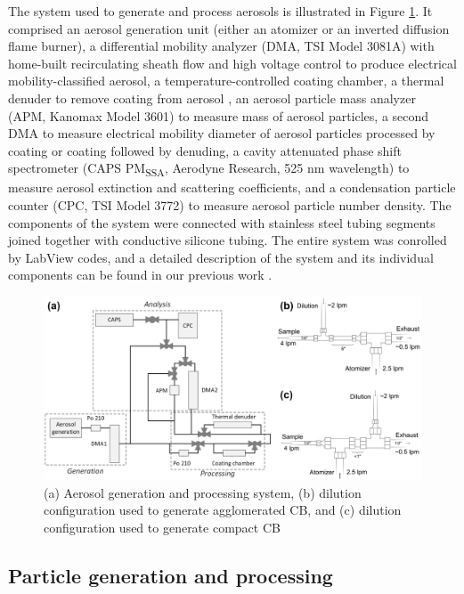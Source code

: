 

The system used to generate and process aerosols is illustrated in Figure \ref{fig:system}. It comprised an aerosol generation unit (either an atomizer or an inverted diffusion flame burner), a differential mobility analyzer (DMA, TSI Model 3081A) with home-built recirculating sheath flow and high voltage control to produce electrical mobility-classified aerosol, a temperature-controlled coating chamber, a thermal denuder to remove coating from aerosol \citep{RN39}, an aerosol particle mass analyzer (APM, Kanomax Model 3601) to measure mass of aerosol particles, a second DMA to measure electrical mobility diameter of aerosol particles processed by coating or coating followed by denuding, a cavity attenuated phase shift spectrometer (CAPS PM\textsubscript{SSA}, Aerodyne Research, 525 nm wavelength) to measure aerosol extinction and scattering coefficients, and a condensation particle counter (CPC, TSI Model 3772) to measure aerosol particle number density. The components of the system were connected with stainless steel tubing segments joined together with conductive silicone tubing. The entire system was conrolled by LabView codes, and a detailed description of the system and its individual components can be found in our previous work \citep{RN48,RN49}.

\begin{figure}[ht]
\centering
\includegraphics[width=\textwidth]{system_diagram.png}
\caption{(a) Aerosol generation and processing system, (b) dilution configuration used to generate agglomerated CB, and (c) dilution configuration used to generate compact CB}
\label{fig:system}
\end{figure}

\subsection{Particle generation and processing}

